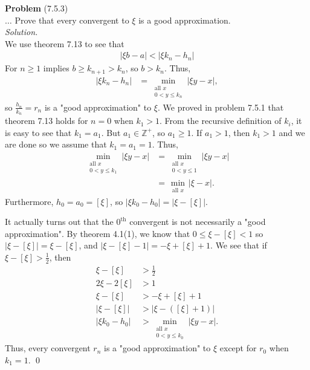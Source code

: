 \documentclass[12 pt]{amsart}
\begin{document}
\phantom{\quad} \vfill
\noindent
\textbf{Problem} (7.5.3) \\[4ex]
  $\ldots$ Prove that every convergent to $\xi$ is a good approximation.
  \\[2ex]
\emph{Solution.} \\[2ex]
  We use theorem 7.13 to see that 
  \begin{align*}
    | \xi b - a | < | \xi k_n - h_n | 
  \end{align*}
  For $n \geq 1$ implies $b \geq k_{n+1} > k_n$, so $b > k_n$.
  Thus, 
  \begin{align*}
    | \xi k_n - h_n | 
    &=
    \min_{\substack{\text{all $x$} \\ 0 < y \leq k_n}}
    | \xi y - x |,
  \end{align*}
  so $\frac{h_n}{k_n} = r_n$ is a "good approximation" to $\xi$.
  We proved in problem 7.5.1 that theorem 7.13 holds for $n = 0$
  when $k_1 > 1$.
  From the recursive definition of $k_i$, it is easy to see that
  $k_1 = a_1$.
  But $a_1 \in \mathbb{Z}^+$, so $a_1 \geq 1$. 
  If $a_1 > 1$, then $k_1 > 1$ and we are done so we assume that
  $k_1 = a_1 = 1$.
  Thus, 
  \begin{align*}
    \min_{\substack{\text{all $x$} \\ 0 < y \leq k_1}}
    | \xi y - x | 
    &=
    \min_{\substack{\text{all $x$} \\ 0 < y \leq 1}}
    | \xi y - x | \\
    &=
    \min_{\substack{\text{all $x$}}}
    | \xi  - x |.
  \end{align*}
  Furthermore, $h_0 = a_0 = [\xi]$, so 
  $|\xi k_0 - h_0| = |\xi - [\xi]|$.

  It actually turns out that the $0^{\text{th}}$ convergent
  is not necessarily a "good approximation".
  By theorem 4.1(1), we know that 
  $0 \leq  \xi  - [\xi] < 1$ so $|\xi - [\xi]| = \xi - [\xi]$,
  and $|\xi - [\xi] - 1| = -\xi + [\xi] + 1$.
  We see that if $\xi - [\xi] > \frac{1}{2}$, then
  \begin{align*}
    \xi - [\xi] &> \frac{1}{2} \\
    2 \xi - 2[\xi] &> 1 \\
    \xi - [\xi] &> -\xi + [\xi] + 1 \\
    |\xi - [\xi]| &> |\xi - ([\xi] + 1)| \\
    |\xi k_0 - h_0| 
    &> 
      \min_{\substack{\text{all $x$}\\ 0 < y \leq k_0}} 
      |\xi y - x|.
  \end{align*}
  Thus, every convergent $r_n$ is a "good approximation" 
  to $\xi$
  except for $r_0$ when $k_1 = 1$.
  \qed
\vfill
\newpage
\end{document}
